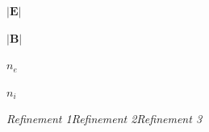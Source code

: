 \documentclass{article}
\begin{document}
\begin{figure}
    \centering
    \begin{minipage}{0.0\textwidth}
    \Large
    \vspace{0.4cm}
    $\mathbf{|E|}$
    
    \vspace{2.2cm}
    $\mathbf{|B|}$
    
    \vspace{2.2cm}
    $n_e$
    
    \vspace{1.9cm}
    $n_i$
    \end{minipage}
    \begin{minipage}{0.9\textwidth}
    \centering
    \textit{\textsf{Refinement 1\hspace{2.5cm}Refinement 2\hspace{2.5cm}Refinement 3\hspace{1cm}}}
    

\end{minipage}
\end{figure}
\end{document}
